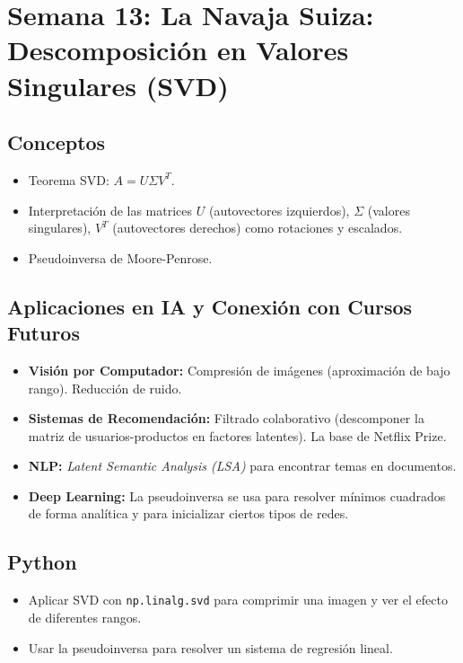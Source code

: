 \documentclass[12pt,a4paper,openany,oneside]{book}
\begin{document}
\section{Semana 13: La Navaja Suiza: Descomposición en Valores Singulares (SVD)}

\subsection{Conceptos}
\begin{itemize}
    \item Teorema SVD: \(A = U\Sigma V^T\).
    \item Interpretación de las matrices \(U\) (autovectores izquierdos), \(\Sigma\) (valores singulares), \(V^T\) (autovectores derechos) como rotaciones y escalados.
    \item Pseudoinversa de Moore-Penrose.
\end{itemize}

\subsection{Aplicaciones en IA y Conexión con Cursos Futuros}
\begin{itemize}
    \item \textbf{Visión por Computador:} Compresión de imágenes (aproximación de bajo rango). Reducción de ruido.
    \item \textbf{Sistemas de Recomendación:} Filtrado colaborativo (descomponer la matriz de usuarios-productos en factores latentes). La base de Netflix Prize.
    \item \textbf{NLP:} \textit{Latent Semantic Analysis (LSA)} para encontrar temas en documentos.
    \item \textbf{Deep Learning:} La pseudoinversa se usa para resolver mínimos cuadrados de forma analítica y para inicializar ciertos tipos de redes.
\end{itemize}

\subsection{Python}
\begin{itemize}
    \item Aplicar SVD con \texttt{np.linalg.svd} para comprimir una imagen y ver el efecto de diferentes rangos.
    \item Usar la pseudoinversa para resolver un sistema de regresión lineal.
\end{itemize}
\end{document}
